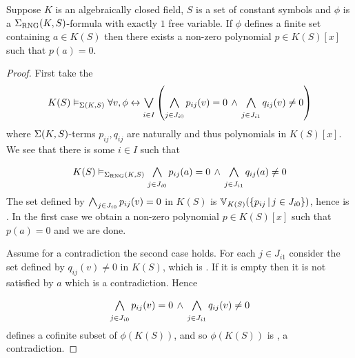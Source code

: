 \begin{lem}
    Suppose $K$ is an algebraically closed field, $S$ is a set of constant
    symbols and 
    $\phi$ is a $\Sigma_{\mathrm{RNG}}(K,S)$-formula with exactly $1$ free variable.
    If $\phi$ defines a finite set containing $a \in K(S)$ 
    then there exists a non-zero polynomial $p \in K(S)[x]$ such that 
    $p(a) = 0$.
\end{lem}
\begin{proof}
    First take the 
    \[K(S) \model{\Si(K,S)} \forall v, \phi \IFF \bigor{i \in I}{} 
        \brkt{\bigand{j \in J_{i0}}{} p_{ij}(v) = 0 \AND 
        \bigand{j \in J_{i1}}{} q_{ij}(v) \ne 0}\]
    where $\Sigma(K,S)$-terms $p_{ij},q_{ij}$ are naturally 
    and thus polynomials in $K(S)[x]$.
    We see that there is some $i \in I$ such that 
    \[K(S) \model{\Si_\RNG(K,S)} 
        \bigand{j \in J_{i0}}{} p_{ij}(a) = 0 \AND 
        \bigand{j \in J_{i1}}{} q_{ij}(a) \ne 0
    \]
    The set defined by $\bigand{j \in J_{i0}}{} p_{ij}(v) = 0$ in $K(S)$
    is $\mathbb{V}_{K(S)}(\left\{p_{ij} \,|\, j \in J_{i0}\right\})$,
    hence is .
    In the first case we obtain a non-zero polynomial $p \in K(S)[x]$ 
    such that $p(a) = 0$ and we are done.

    Assume for a contradiction the second case holds.
    For each $j \in J_{i1}$ 
    consider the set defined by $q_{ij}(v) \ne 0$ in $K(S)$,
    which is .
    If it is empty then it is not satisfied by $a$ which is a contradiction.
    Hence 
    \[
        \bigand{j \in J_{i0}}{} p_{ij}(v) = 0 \AND 
        \bigand{j \in J_{i1}}{} q_{ij}(v) \ne 0
    \]
    defines a cofinite subset of $\phi(K(S))$, and so $\phi(K(S))$ is 
    , a contradiction.
\end{proof}


